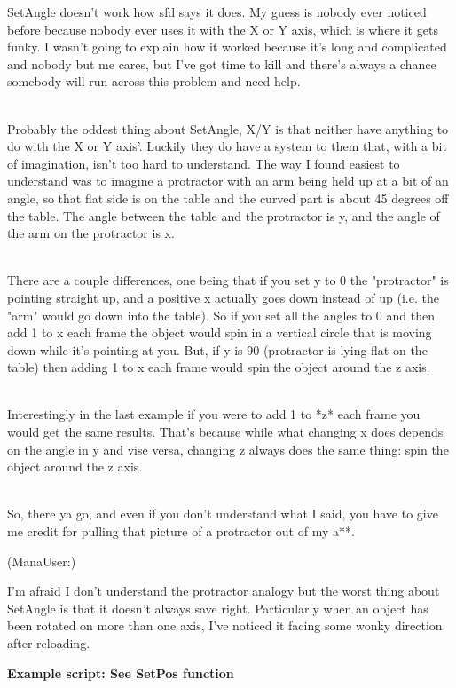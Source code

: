 SetAngle doesn't work how sfd says it does. My guess is nobody ever
noticed before because nobody ever uses it with the X or Y axis, which
is where it gets funky. I wasn't going to explain how it worked because
it's long and complicated and nobody but me cares, but I've got time to
kill and there's always a chance somebody will run across this problem
and need help.\\
\strut \\
Probably the oddest thing about SetAngle, X/Y is that neither have
anything to do with the X or Y axis'. Luckily they do have a system to
them that, with a bit of imagination, isn't too hard to understand. The
way I found easiest to understand was to imagine a protractor with an
arm being held up at a bit of an angle, so that flat side is on the
table and the curved part is about 45 degrees off the table. The angle
between the table and the protractor is y, and the angle of the arm on
the protractor is x.\\
\strut \\
There are a couple differences, one being that if you set y to 0 the
"protractor" is pointing straight up, and a positive x actually goes
down instead of up (i.e. the "arm" would go down into the table). So if
you set all the angles to 0 and then add 1 to x each frame the object
would spin in a vertical circle that is moving down while it's pointing
at you. But, if y is 90 (protractor is lying flat on the table) then
adding 1 to x each frame would spin the object around the z axis.\\
\strut \\
Interestingly in the last example if you were to add 1 to *z* each frame
you would get the same results. That's because while what changing x
does depends on the angle in y and vise versa, changing z always does
the same thing: spin the object around the z axis.\\
\strut \\
So, there ya go, and even if you don't understand what I said, you have
to give me credit for pulling that picture of a protractor out of my
a**.

(ManaUser:)

I'm afraid I don't understand the protractor analogy but the worst thing
about SetAngle is that it doesn't always save right. Particularly when
an object has been rotated on more than one axis, I've noticed it facing
some wonky direction after reloading.

\textbf{Example script: See SetPos function}

